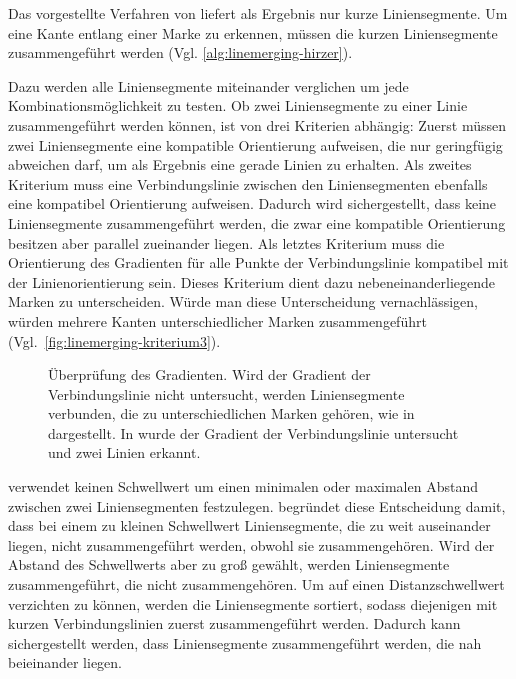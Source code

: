Das vorgestellte Verfahren von \citeauthor{clarke96} liefert als Ergebnis nur kurze Liniensegmente. Um eine Kante
 entlang einer Marke zu erkennen, müssen die kurzen Liniensegmente zusammengeführt werden
 (Vgl. \autoref{alg:linemerging-hirzer}).

Dazu werden alle Liniensegmente miteinander verglichen um jede Kombinationsmöglichkeit zu testen. Ob zwei
 Liniensegmente zu einer Linie zusammengeführt werden können, ist von drei Kriterien abhängig: Zuerst müssen zwei
 Liniensegmente eine kompatible Orientierung aufweisen, die nur geringfügig abweichen darf, um als Ergebnis eine gerade
 Linien zu erhalten. Als zweites Kriterium muss eine Verbindungslinie zwischen den Liniensegmenten ebenfalls eine
 kompatibel Orientierung aufweisen. Dadurch wird sichergestellt, dass keine Liniensegmente zusammengeführt werden, die
 zwar eine kompatible Orientierung besitzen aber parallel zueinander liegen. Als letztes Kriterium muss die
 Orientierung des Gradienten für alle Punkte der Verbindungslinie kompatibel mit der Linienorientierung sein. Dieses
 Kriterium dient dazu nebeneinanderliegende Marken zu unterscheiden. Würde man diese Unterscheidung vernachlässigen,
 würden mehrere Kanten unterschiedlicher Marken zusammengeführt (Vgl.~\autoref{fig:linemerging-kriterium3}).
\begin{figure}[!ht]
	\centering
	\caption{Überprüfung des Gradienten. Wird der Gradient der Verbindungslinie nicht untersucht, werden Liniensegmente
	 verbunden, die zu unterschiedlichen Marken gehören, wie in  dargestellt. In
	  wurde der Gradient der Verbindungslinie untersucht und zwei Linien erkannt.}
	\label{fig:linemerging-kriterium3}
\end{figure}

\citeauthor{hirzer08} verwendet keinen Schwellwert um einen minimalen oder maximalen Abstand zwischen zwei
 Liniensegmenten festzulegen. \citeauthor{hirzer08} begründet diese Entscheidung damit, dass bei einem zu kleinen
 Schwellwert Liniensegmente, die zu weit auseinander liegen, nicht zusammengeführt werden, obwohl sie zusammengehören.
 Wird der Abstand des Schwellwerts aber zu groß gewählt, werden Liniensegmente zusammengeführt, die nicht
 zusammengehören. Um auf einen Distanzschwellwert verzichten zu können, werden die Liniensegmente sortiert, sodass
 diejenigen mit kurzen Verbindungslinien zuerst zusammengeführt werden. Dadurch kann sichergestellt werden, dass
 Liniensegmente zusammengeführt werden, die nah beieinander liegen.


